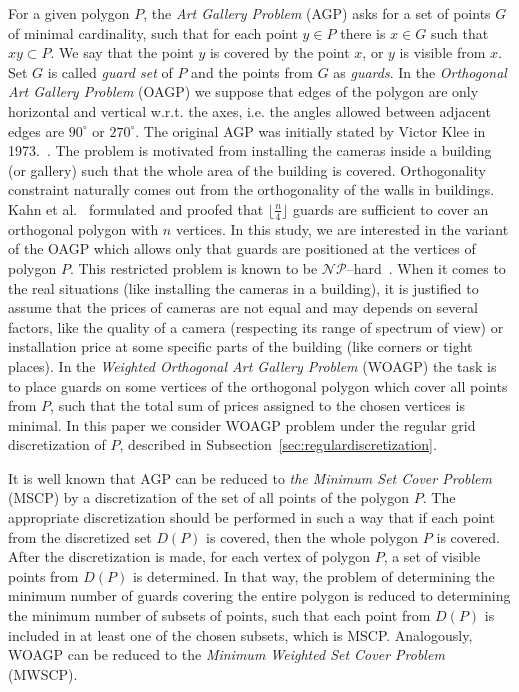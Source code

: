 \documentclass[runningheads,a4paper]{elsarticle}
\begin{document}
	For a given polygon $P$, the \emph{Art Gallery Problem} (AGP) asks for a set of points $G$ of minimal cardinality,  such that for each point $y \in P$ there is $x \in G$ such that $xy \subset P$. We say that the point $y$ is covered by the point $x$, or $y$ is visible from $x$. Set $G$ is called \emph{guard set} of $P$ and the points from $G$ as \emph{guards}. In the \emph{Orthogonal Art Gallery Problem} (OAGP) we suppose that edges of the polygon are only horizontal and vertical w.r.t. the axes, i.e.  the angles allowed between adjacent edges are  $90^{\circ}$ or $270^{\circ}$. The original AGP was initially stated by Victor  Klee in 1973.~\cite{o1987art}.  The problem is motivated from installing the cameras inside a building (or gallery) such that the whole area of the building is covered. Orthogonality constraint naturally comes out from the orthogonality of the walls in buildings. Kahn et al.~\cite{kahn1983traditional} formulated and proofed that 	$\lfloor \frac{n}{4} \rfloor$ guards are  sufficient to cover an orthogonal polygon with $n$ vertices.      In this study, we are interested in the variant of the OAGP which allows only that guards are positioned at the vertices of polygon $P$. This restricted problem is known to be $\mathcal{NP}$--hard~\cite{schuchardt1995two,katz2008guarding}.  When it comes to the real situations (like installing the cameras in a building), it is justified to assume that the prices of cameras are not equal and may depends on several factors, like the quality of a camera   (respecting its range of spectrum of view)  or installation price at some specific parts of the building (like corners or tight places).  In the \emph{Weighted Orthogonal Art Gallery Problem} (WOAGP) the task is to place guards on some vertices of the orthogonal polygon which cover all points from $P$, such that the total sum of prices assigned to the chosen vertices is minimal. In this paper we consider WOAGP problem under the regular grid discretization of $P$, described in Subsection~\ref{sec:regulardiscretization}.
	
	It is well known that AGP can be reduced to \emph{the Minimum Set Cover Problem} (MSCP) by a discretization of the set of all points of the polygon $P$. The appropriate discretization should be performed in such a way that if each point from the discretized set $D(P)$ is covered, then the whole polygon $P$ is covered. After the discretization is made, for each vertex of polygon $P$, a set of visible points from $D(P)$ is determined. In that way, the problem of determining the minimum number of guards covering the entire polygon is reduced to determining the minimum number of subsets of points, such that each point from $D(P)$ is included in at least one of the chosen subsets, which is MSCP. Analogously, WOAGP can be reduced to the \emph{Minimum Weighted  Set Cover Problem} (MWSCP).
	
\end{document}
